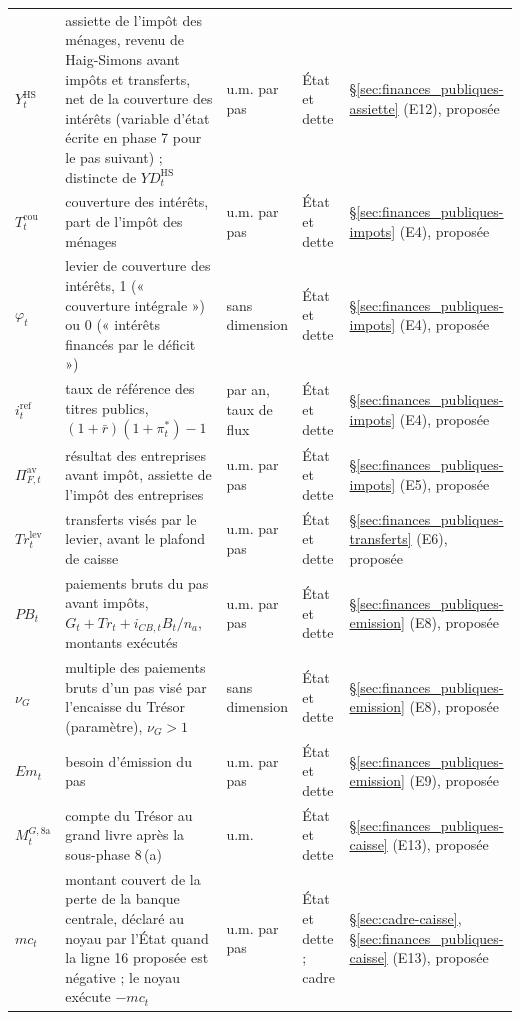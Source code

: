 \documentclass[11pt,a4paper]{article}
\begin{document}
\begin{center}
\begin{longtable}{>{\raggedright\arraybackslash}p{1.6cm}>{\raggedright\arraybackslash}p{5.6cm}>{\raggedright\arraybackslash}p{2.0cm}>{\raggedright\arraybackslash}p{2.2cm}>{\raggedright\arraybackslash}p{2.8cm}}
$Y^{\mathrm{HS}}_t$ & assiette de l'impôt des ménages, revenu de Haig-Simons avant impôts et transferts, net de la couverture des intérêts (variable d'état écrite en phase 7 pour le pas suivant) ; distincte de $\mathit{YD}^{\mathrm{HS}}_t$ & u.m. par pas & État et dette & \S\ref{sec:finances_publiques-assiette} (E12), proposée\\
$T^{\mathrm{cou}}_t$ & couverture des intérêts, part de l'impôt des ménages & u.m. par pas & État et dette & \S\ref{sec:finances_publiques-impots} (E4), proposée\\
$\varphi_t$ & levier de couverture des intérêts, 1 (« couverture intégrale ») ou 0 (« intérêts financés par le déficit ») & sans dimension & État et dette & \S\ref{sec:finances_publiques-impots} (E4), proposée\\
$i^{\mathrm{ref}}_t$ & taux de référence des titres publics, $(1 + \bar r)(1 + \pi^\ast_t) - 1$ & par an, taux de flux & État et dette & \S\ref{sec:finances_publiques-impots} (E4), proposée\\
$\Pi^{\mathrm{av}}_{F,t}$ & résultat des entreprises avant impôt, assiette de l'impôt des entreprises & u.m. par pas & État et dette & \S\ref{sec:finances_publiques-impots} (E5), proposée\\
$\mathit{Tr}^{\mathrm{lev}}_t$ & transferts visés par le levier, avant le plafond de caisse & u.m. par pas & État et dette & \S\ref{sec:finances_publiques-transferts} (E6), proposée\\
$\mathit{PB}_t$ & paiements bruts du pas avant impôts, $G_t + \mathit{Tr}_t + i_{\mathit{CB},t}B_t/n_a$, montants exécutés & u.m. par pas & État et dette & \S\ref{sec:finances_publiques-emission} (E8), proposée\\
$\nu_G$ & multiple des paiements bruts d'un pas visé par l'encaisse du Trésor (paramètre), $\nu_G > 1$ & sans dimension & État et dette & \S\ref{sec:finances_publiques-emission} (E8), proposée\\
$\mathit{Em}_t$ & besoin d'émission du pas & u.m. par pas & État et dette & \S\ref{sec:finances_publiques-emission} (E9), proposée\\
$M^{G,8\mathrm{a}}_t$ & compte du Trésor au grand livre après la sous-phase 8\,(a) & u.m. & État et dette & \S\ref{sec:finances_publiques-caisse} (E13), proposée\\
$\mathit{mc}_t$ & montant couvert de la perte de la banque centrale, déclaré au noyau par l'État quand la ligne 16 proposée est négative ; le noyau exécute $-\mathit{mc}_t$ & u.m. par pas & État et dette ; cadre & \S\ref{sec:cadre-caisse}, \S\ref{sec:finances_publiques-caisse} (E13), proposée\\
\bottomrule
\end{longtable}
\end{center}
\end{document}
